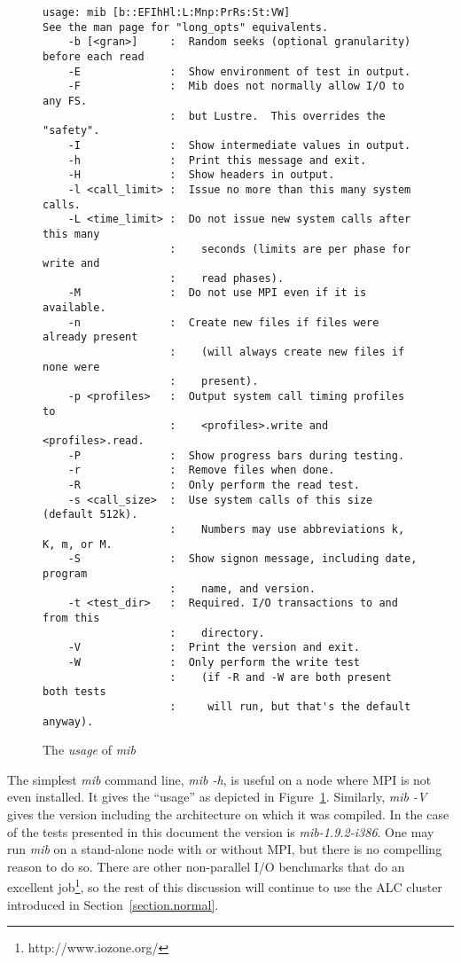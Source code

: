\documentclass{article}
\begin{document}
\begin{figure}
{\small
  \begin{verbatim}
usage: mib [b::EFIhHl:L:Mnp:PrRs:St:VW]
See the man page for "long_opts" equivalents.
    -b [<gran>]     :  Random seeks (optional granularity) before each read
    -E              :  Show environment of test in output.
    -F              :  Mib does not normally allow I/O to any FS.
                    :  but Lustre.  This overrides the "safety".
    -I              :  Show intermediate values in output.
    -h              :  Print this message and exit.
    -H              :  Show headers in output.
    -l <call_limit> :  Issue no more than this many system calls.
    -L <time_limit> :  Do not issue new system calls after this many
                    :    seconds (limits are per phase for write and
                    :    read phases).
    -M              :  Do not use MPI even if it is available.
    -n              :  Create new files if files were already present
                    :    (will always create new files if none were
                    :    present).
    -p <profiles>   :  Output system call timing profiles to 
                    :    <profiles>.write and <profiles>.read.
    -P              :  Show progress bars during testing.
    -r              :  Remove files when done.
    -R              :  Only perform the read test.
    -s <call_size>  :  Use system calls of this size (default 512k).
                    :    Numbers may use abbreviations k, K, m, or M.
    -S              :  Show signon message, including date, program
                    :    name, and version.
    -t <test_dir>   :  Required. I/O transactions to and from this
                    :    directory.
    -V              :  Print the version and exit.
    -W              :  Only perform the write test
                    :    (if -R and -W are both present both tests 
                    :     will run, but that's the default anyway).
  \end{verbatim}
}
\caption{The {\em usage} of {\em mib}}
\label{figure.usage}
\end{figure}

The simplest {\em mib} command line, {\em mib -h}, is useful on a node
where MPI is not even installed.  It gives the ``usage'' as depicted
in Figure~\ref{figure.usage}.  Similarly, {\em mib -V} gives the
version including the architecture on which it was compiled.  In the
case of the tests presented in this document the version is {\em
mib-1.9.2-i386}.  One may run {\em mib} on a stand-alone node with or
without MPI, but there is no compelling reason to do so.  There are
other non-parallel I/O benchmarks that do an excellent
job\footnote{http://www.iozone.org/}, so the rest of this discussion
will continue to use the ALC cluster introduced in
Section~\ref{section.normal}.
\end{document}
